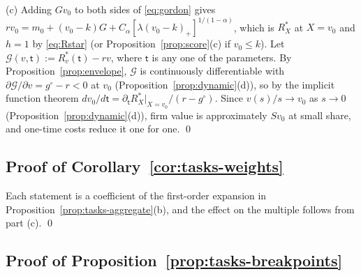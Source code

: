 (c) Adding $Gv_0$ to both sides of \eqref{eq:gordon} gives $rv_0=m_0+(v_0-k)G+C_\alpha[\lambda(v_0-k)_+]^{1/(1-\alpha)}$, which is $R^*_X$ at $X=v_0$ and $h=1$ by \eqref{eq:Rstar} (or Proposition~\ref{prop:score}(c) if $v_0\le k$). Let $\mathcal G(v,\mathsf t):=R^*_v(\mathsf t)-rv$, where $\mathsf t$ is any one of the parameters. By Proposition~\ref{prop:envelope}, $\mathcal G$ is continuously differentiable with $\partial\mathcal G/\partial v=g^\circ-r<0$ at $v_0$ (Proposition~\ref{prop:dynamic}(d)), so by the implicit function theorem $dv_0/d\mathsf t=\partial_{\mathsf t}R^*_X|_{X=v_0}/(r-g^\circ)$. Since $v(s)/s\to v_0$ as $s\to 0$ (Proposition~\ref{prop:dynamic}(d)), firm value is approximately $Sv_0$ at small share, and one-time costs reduce it one for one. \qed

\subsection*{Proof of Corollary~\ref{cor:tasks-weights}}

Each statement is a coefficient of the first-order expansion in Proposition~\ref{prop:tasks-aggregate}(b), and the effect on the multiple follows from part (c). \qed

\subsection*{Proof of Proposition~\ref{prop:tasks-breakpoints}}

